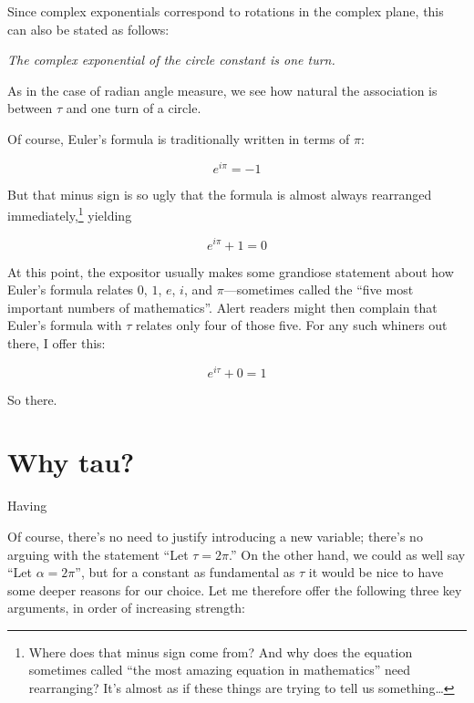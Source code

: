 \documentclass{article}
\begin{document}
Since complex exponentials correspond to rotations in the complex plane, this can also be stated as follows:

\begin{center}
\emph{The complex exponential of the circle constant is one turn.}
\end{center}

\noindent As in the case of radian angle measure, we see how natural the association is between $\tau$ and one turn of a circle.


Of course, Euler's formula is traditionally written in terms of $\pi$:


\[ e^{i\pi} = -1 \]

\noindent But that minus sign is so ugly that the formula is almost always rearranged immediately,\footnote{Where does that minus sign come from? And why does the equation sometimes called ``the most amazing equation in mathematics'' need rearranging? It's almost as if these things are trying to tell us something\ldots} yielding

\[ e^{i\pi} + 1 = 0 \]

\noindent At this point, the expositor usually makes some grandiose statement about how Euler's formula relates $0$, $1$, $e$, $i$, and $\pi$---sometimes called the ``five most important numbers of mathematics''. Alert readers might then complain that Euler's formula with $\tau$ relates only four of those five. For any such whiners out there, I offer this:

\[ e^{i\tau} + 0 = 1 \]

\noindent So there.

\section{Why tau?} %
\label{sec:why_tau}

Having 

Of course, there's no need to justify introducing a new variable; there's no arguing with the statement ``Let $\tau = 2\pi$.'' On the other hand, we could as well say ``Let $\alpha = 2\pi$'', but for a constant as fundamental as $\tau$ it would be nice to have some deeper reasons for our choice. Let me therefore offer the following three key arguments, in order of increasing strength:
\end{document}
